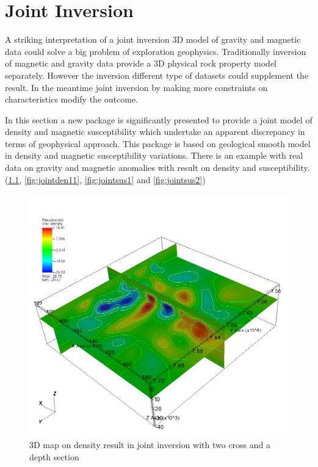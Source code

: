 \chapter{Joint Inversion}\label{Chp:cook:joint inversion}


A striking interpretation of a joint inversion 3D model of gravity and magnetic data could solve a big problem of exploration geophysics. Traditionally inversion of magnetic and gravity data provide a 3D physical rock property model separately. However the inversion different type of datasets could supplement the result. In the meantime joint inversion by making more constraints on characteristics modify the outcome.

In this section a new package is significantly presented to provide a joint model of density and magnetic susceptibility which undertake an apparent discrepancy in terms of geophysical approach. This package is based on geological smooth model in density and magnetic susceptibility variations. There is an example with real data on gravity and magnetic anomalies with result on density and susceptibility.(\ref{fig:jointden1}, \ref{fig:jointden11}, \ref{fig:jointsus1} and \ref{fig:jointsus2})


\begin{figure}
\centering
\includegraphics[width=\textwidth]{jointden1.png}
\caption{3D map on density result in joint inversion with two cross and a depth section}
\label{fig:jointden1}
\end{figure}


